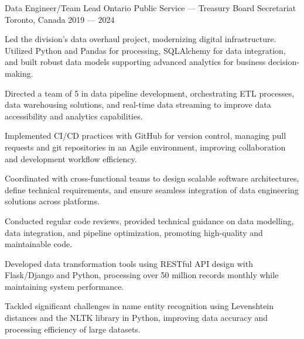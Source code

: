 \begin{cventries}
 \cventry%
 {Data Engineer/Team Lead}
 {Ontario Public Service --- Treasury Board Secretariat}
 {Toronto, Canada}
 {2019 --- 2024}
 {
	 \begin{cvitems}
		 \item Led the division's data overhaul project, modernizing digital infrastructure. Utilized Python and Pandas for processing, SQLAlchemy for data integration, and built robust data models supporting advanced analytics for business decision-making.
		 \item Directed a team of 5 in data pipeline development, orchestrating ETL processes, data warehousing solutions, and real-time data streaming to improve data accessibility and analytics capabilities.
		 \item Implemented CI/CD practices with GitHub for version control, managing pull requests and git repositories in an Agile environment, improving collaboration and development workflow efficiency.
		 \item Coordinated with cross-functional teams to design scalable software architectures, define technical requirements, and ensure seamless integration of data engineering solutions across platforms.
		 \item Conducted regular code reviews, provided technical guidance on data modelling, data integration, and pipeline optimization, promoting high-quality and maintainable code.
		 \item Developed data transformation tools using RESTful API design with Flask/Django and Python, processing over 50 million records monthly while maintaining system performance.
		 \item Tackled significant challenges in name entity recognition using Levenshtein distances and the NLTK library in Python, improving data accuracy and processing efficiency of large datasets.
	 \end{cvitems}
 }


\end{cventries}

